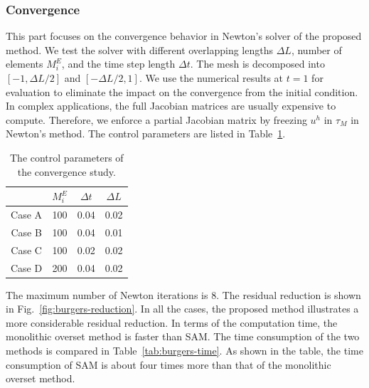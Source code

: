 \documentclass[preprint,12pt,sort&compress]{elsarticle}
\theoremstyle{definition}%
\begin{document}
\subsubsection{Convergence}
This part focuses on the convergence behavior in Newton's solver of the proposed method.
We test the solver with different overlapping lengths $\Delta L$, number of elements $M_i^E$, and the time step length $\Delta t$.
The mesh is decomposed into $[-1, \Delta L/2]$ and $[-\Delta L/2, 1]$.
We use the numerical results at $t=1$ for evaluation to eliminate the impact on the convergence from the initial condition.
In complex applications, the full Jacobian matrices are usually expensive to compute. 
Therefore, we enforce a partial Jacobian matrix by freezing $u^h$ in $\tau_M$ in Newton's
method.
The control parameters are listed in Table~\ref{tab:burgers-control-parameters}.
\begin{table}
  \centering
  \begin{tabular}{ |c|c|c|c|}
    \hline
    & $M_i^E$ & $\Delta t$ & $\Delta L$ \\
    \hline
    \hline
    Case A & 100 & 0.04 & 0.02 \\
    Case B & 100 & 0.04 & 0.01 \\
    Case C & 100 & 0.02 & 0.02 \\
    Case D & 200 & 0.04 & 0.02 \\
    \hline
  \end{tabular}
  \caption{The control parameters of the convergence study.}
  \label{tab:burgers-control-parameters}
\end{table}
The maximum number of Newton iterations is 8. 
The residual reduction is shown in Fig.~\ref{fig:burgers-reduction}.
In all the cases, the proposed method illustrates a more considerable residual reduction. In terms of the computation time, the monolithic overset method is faster than SAM. The time consumption of the two methods is compared in Table~\ref{tab:burgers-time}. As shown in the table, the time consumption of SAM is about four times more than that of the monolithic overset method.
\end{document}
